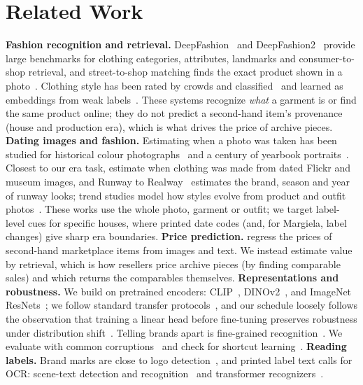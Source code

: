 \section{Related Work}
\label{sec:related}
\textbf{Fashion recognition and retrieval.} DeepFashion~\cite{liu2016deepfashion} and
DeepFashion2~\cite{ge2019deepfashion2} provide large benchmarks for clothing categories,
attributes, landmarks and consumer-to-shop retrieval, and street-to-shop matching finds the exact
product shown in a photo~\cite{kiapour2015where}. Clothing style has been rated by crowds and
classified~\cite{kiapour2014hipster} and learned as embeddings from weak
labels~\cite{simoserra2016fashion}. These systems recognize \emph{what} a garment
is or find the same product online; they do not predict a second-hand item's provenance (house and
production era), which is what drives the price of archive pieces.
\textbf{Dating images and fashion.} Estimating when a photo was taken has been studied for
historical colour photographs~\cite{palermo2012dating} and a century of yearbook
portraits~\cite{ginosar2017century}. Closest to our era task,
\citet{vittayakorn2017when} estimate when clothing was made from dated Flickr and museum images, and
Runway to Realway~\cite{vittayakorn2015runway} estimates the brand, season and year of runway looks;
trend studies model how styles evolve from product and outfit
photos~\cite{alhalah2017fashion,he2016ups,mall2019geostyle,hsiao2021culture}. These works use the
whole photo, garment or outfit; we target label-level cues for specific houses, where printed date
codes (and, for Margiela, label changes) give sharp era boundaries.
\textbf{Price prediction.} \citet{han2020price} regress the prices of second-hand marketplace items
from images and text. We instead estimate value by retrieval, which is how resellers price archive
pieces (by finding comparable sales) and which returns the comparables themselves.
\textbf{Representations and robustness.} We build on pretrained encoders: CLIP~\cite{radford2021clip},
DINOv2~\cite{oquab2024dinov2}, and ImageNet~\cite{deng2009imagenet} ResNets~\cite{he2016resnet};
we follow standard transfer protocols~\cite{kornblith2019transfer}, and our schedule loosely follows
the observation that training a linear head before fine-tuning preserves robustness under
distribution shift~\cite{kumar2022finetuning}. Telling brands apart is fine-grained
recognition~\cite{wei2022finegrained}. We evaluate with common
corruptions~\cite{hendrycks2019corruptions} and check for shortcut
learning~\cite{geirhos2020shortcut}.
\textbf{Reading labels.} Brand marks are close to logo detection~\cite{wang2022logodet3k}, and
printed label text calls for OCR: scene-text detection and recognition~\cite{baek2019craft,shi2017crnn}
and transformer recognizers~\cite{li2023trocr}.
